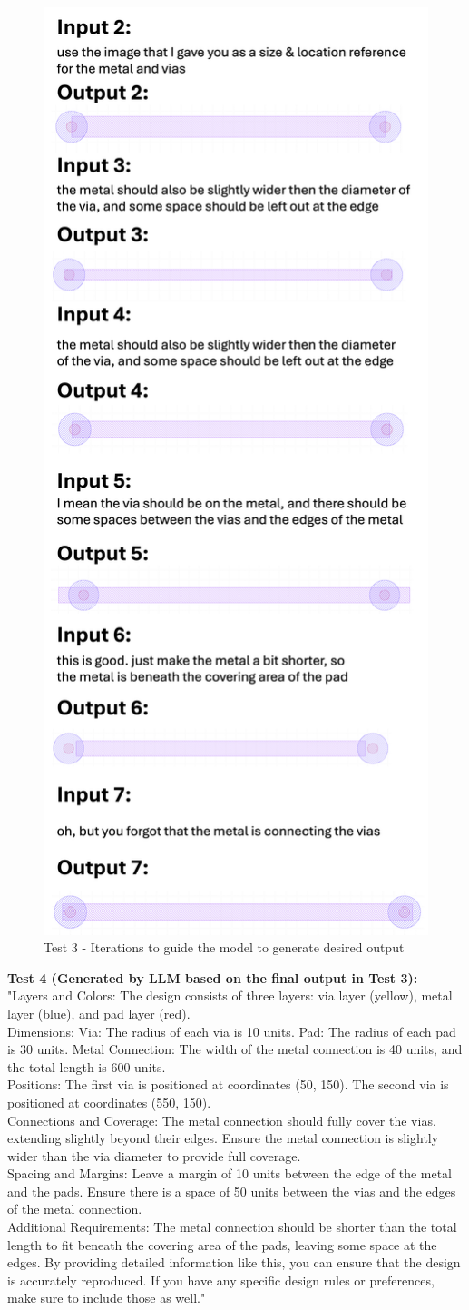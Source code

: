 \documentclass{article}
\begin{document}
\begin{figure}[!h]
\centering
\includegraphics[width=0.5\linewidth]{Styles/Test3.png}
\caption{Test 3 - Iterations to guide the model to generate desired output}
\label{fig:test3_chat}
\end{figure}

\textbf{Test 4 (Generated by LLM based on the final output in Test 3):}\\
"Layers and Colors:
The design consists of three layers: via layer (yellow), metal layer (blue), and pad layer (red).\\
Dimensions:
Via: The radius of each via is 10 units.
Pad: The radius of each pad is 30 units.
Metal Connection: The width of the metal connection is 40 units, and the total length is 600 units.\\
Positions:
The first via is positioned at coordinates (50, 150).
The second via is positioned at coordinates (550, 150).\\
Connections and Coverage:
The metal connection should fully cover the vias, extending slightly beyond their edges.
Ensure the metal connection is slightly wider than the via diameter to provide full coverage.\\
Spacing and Margins:
Leave a margin of 10 units between the edge of the metal and the pads.
Ensure there is a space of 50 units between the vias and the edges of the metal connection.\\
Additional Requirements:
The metal connection should be shorter than the total length to fit beneath the covering area of the pads, leaving some space at the edges.
By providing detailed information like this, you can ensure that the design is accurately reproduced. If you have any specific design rules or preferences, make sure to include those as well."
\end{document}
